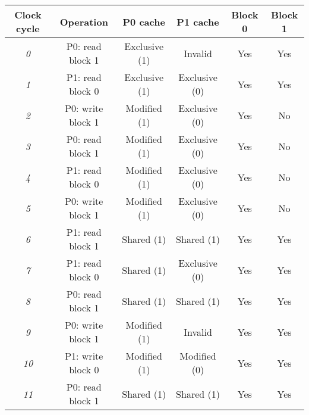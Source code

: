 \begin{table}[H]
    \centering
    \begin{tabular}{c|c|cc|cc}
    \textbf{Clock cycle} & \textbf{Operation} & \textbf{P0 cache} & \textbf{P1 cache} & \textbf{Block 0} & \textbf{Block 1} \\ \hline
    \textit{0}           & P0: read block 1   & Exclusive (1)     & Invalid           & Yes              & Yes              \\
    \textit{1}           & P1: read block 0   & Exclusive (1)     & Exclusive (0)     & Yes              & Yes              \\
    \textit{2}           & P0: write block 1  & Modified (1)      & Exclusive (0)     & Yes              & No               \\
    \textit{3}           & P0: read block 1   & Modified (1)      & Exclusive (0)     & Yes              & No               \\
    \textit{4}           & P1: read block 0   & Modified (1)      & Exclusive (0)     & Yes              & No               \\
    \textit{5}           & P0: write block 1  & Modified (1)      & Exclusive (0)     & Yes              & No               \\
    \textit{6}           & P1: read block 1   & Shared (1)        & Shared (1)        & Yes              & Yes              \\
    \textit{7}           & P1: read block 0   & Shared (1)        & Exclusive (0)     & Yes              & Yes              \\
    \textit{8}           & P0: read block 1   & Shared (1)        & Shared (1)        & Yes              & Yes              \\
    \textit{9}           & P0: write block 1  & Modified (1)      & Invalid           & Yes              & Yes              \\
    \textit{10}          & P1: write block 0  & Modified (1)      & Modified (0)      & Yes              & Yes              \\
    \textit{11}          & P0: read block 1   & Shared (1)        & Shared (1)        & Yes              & Yes             
    \end{tabular}
\end{table}